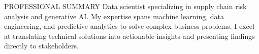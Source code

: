 \begin{rSection}{PROFESSIONAL SUMMARY}
    Data scientist specializing in supply chain risk analysis and generative AI. My expertise spans machine learning, data engineering, and predictive analytics to solve complex business problems. I excel at translating technical solutions into actionable insights and presenting findings directly to stakeholders.
\end{rSection}